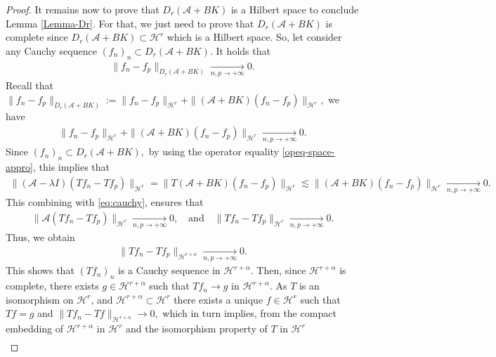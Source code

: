 \documentclass[11pt, dvipsnames]{amsart}
\begin{document}
\begin{proof}
It remains now to prove that $D_r(\mathcal{A}+BK)$ is a Hilbert space to conclude Lemma \ref{Lemma-Dr}. For that, we just need to prove that $D_r(\mathcal{A}+BK)$ is complete since $D_r(\mathcal{A}+BK)\subset \mathcal{H}^r$ which is a Hilbert space. So, let consider any Cauchy sequence $(f_n)_n\subset D_r(\mathcal{A}+BK).$ It holds that
\begin{align*}
    \|f_n-f_p\|_{D_r(\mathcal{A}+BK)}\underset{n,p\rightarrow+\infty}{\longrightarrow} 0.
\end{align*}
Recall that $\|f_n-f_p\|_{D_r(\mathcal{A}+BK)}:=\|f_n-f_p\|_{\mathcal{H}^r}+\|(\mathcal{A}+BK)(f_n-f_p)\|_{\mathcal{H}^r},$ we have
\begin{align}
    \|f_n-f_p\|_{\mathcal{H}^r}+\|(\mathcal{A}+BK)(f_n-f_p)\|_{\mathcal{H}^r}\underset{n,p\rightarrow+\infty}{\longrightarrow} 0.\label{eq:cauchy}
\end{align}
Since $(f_n)_n\subset D_r(\mathcal{A}+BK),$ by using the operator equality \eqref{opeq-space-appro}, this implies that
\begin{align*}
    \|(\mathcal{A}-\lambda I)(Tf_n-Tf_p)\|_{\mathcal{H}^r}=\|T(\mathcal{A}+BK)(f_n-f_p)\|_{\mathcal{H}^r}\lesssim \|(\mathcal{A}+BK)(f_n-f_p)\|_{\mathcal{H}^r}\underset{n,p\rightarrow+\infty}{\longrightarrow} 0.
\end{align*}
This combining with \eqref{eq:cauchy}, ensures that 
\begin{align*}
  \|\mathcal{A}(Tf_n-Tf_p)\|_{\mathcal{H}^r}  \underset{n,p\rightarrow+\infty}{\longrightarrow} 0,\quad \text{and}\quad \|Tf_n-Tf_p\|_{\mathcal{H}^r}  \underset{n,p\rightarrow+\infty}{\longrightarrow} 0.
\end{align*} Thus, we obtain
\begin{align*}
   \|Tf_n-Tf_p\|_{\mathcal{H}^{r+\alpha}}  \underset{n,p\rightarrow+\infty}{\longrightarrow} 0.
\end{align*}
This shows that $(Tf_n)_n$ is a Cauchy sequence in $\mathcal{H}^{r+\alpha}.$  Then, since $\mathcal{H}^{r+\alpha}$ is complete,
there exists $g\in \mathcal{H}^{r+\alpha}$ such that $T f_n
\longrightarrow g$ in $\mathcal{H}^{r+\alpha}$.  As $T$ is an isomorphism on $\mathcal{H}^{r}$, and $\mathcal{H}^{r+\alpha}\subset \mathcal{H}^{r}$ there exists a unique $f\in \mathcal{H}^{r}$ such that $Tf=g$ and $\|T f_n-Tf\|_{\mathcal{H}^{r+\alpha}}
\longrightarrow 0,$ which in turn implies, from the compact embedding of $\mathcal{H}^{r+\alpha}$ in $\mathcal{H}^{r}$ and the isomorphism property of $T$ in $\mathcal{H}^{r}$
\begin{align}

\end{align}
\end{proof}
\end{document}
